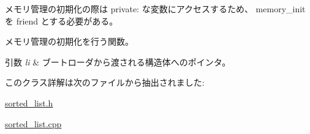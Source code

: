 メモリ管理の初期化の際は private\+: な変数にアクセスするため、 memory\+\_\+init を friend とする必要がある。

メモリ管理の初期化を行う関数。 
\begin{DoxyParams}{引数}
{\em li} & ブートローダから渡される構造体へのポインタ。 \\
\hline
\end{DoxyParams}


このクラス詳解は次のファイルから抽出されました\+:\begin{DoxyCompactItemize}
\item 
\hyperlink{sorted__list_8h}{sorted\+\_\+list.\+h}\item 
\hyperlink{sorted__list_8cpp}{sorted\+\_\+list.\+cpp}\end{DoxyCompactItemize}
